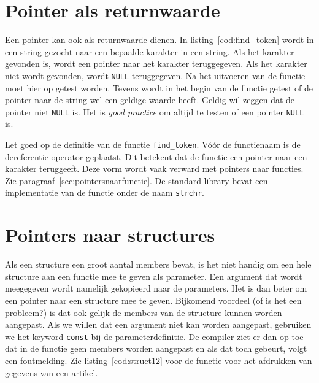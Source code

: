 \section{Pointer als returnwaarde}
\label{sec:pointersalsreturnwaarde}
Een pointer kan ook als returnwaarde dienen. In listing~\ref{cod:find_token} wordt in een string gezocht naar een bepaalde karakter in een string. Als het karakter gevonden is, wordt een pointer naar het karakter teruggegeven. Als het karakter niet wordt gevonden, wordt \texttt{NULL} teruggegeven. Na het uitvoeren van de functie moet hier op getest worden. Tevens wordt in het begin van de functie getest of de pointer naar de string wel een geldige waarde heeft. Geldig wil zeggen dat de pointer niet \texttt{NULL} is. Het is \textsl{good practice} om altijd te testen of een pointer \texttt{NULL} is.


Let goed op de definitie van de functie \texttt{find\_token}. Vóór de functienaam is de dereferentie-operator geplaatst. Dit betekent dat de functie een pointer naar een karakter teruggeeft. Deze vorm wordt vaak verward met pointers naar functies. Zie paragraaf~\ref{sec:pointersnaarfunctie}. De standard library bevat een implementatie van de functie onder de naam \lstinline|strchr|.


\section{Pointers naar structures}
Als een structure een groot aantal members bevat, is het niet handig om een hele structure aan een functie mee te geven als parameter. Een argument dat wordt meegegeven wordt namelijk gekopieerd naar de parameters. Het is dan beter om een pointer naar een structure mee te geven. Bijkomend voordeel (of is het een probleem?) is dat ook gelijk de members van de structure kunnen worden aangepast. Als we willen dat een argument niet kan worden aangepast, gebruiken we het keyword \texttt{const} bij de parameterdefinitie. De compiler ziet er dan op toe dat in de functie geen members worden aangepast en als dat toch gebeurt, volgt een foutmelding. Zie listing~\ref{cod:struct12} voor de functie voor het afdrukken van gegevens van een artikel.


